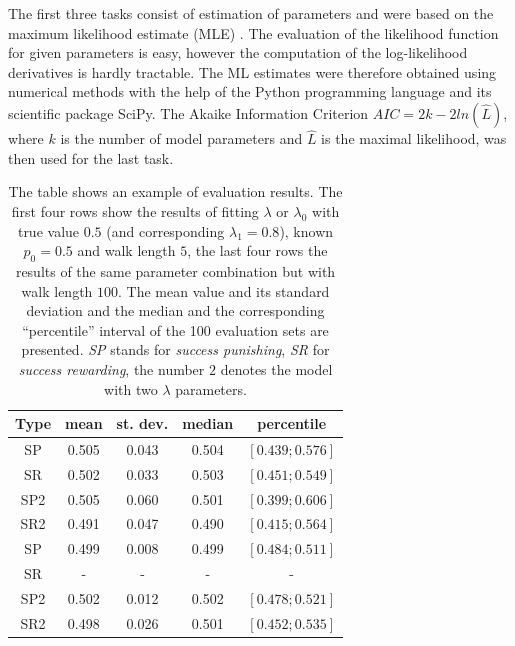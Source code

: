 \documentclass{amsart}
\theoremstyle{definition}
\theoremstyle{plain}
\theoremstyle{plain}
\theoremstyle{plain}
\numberwithin{equation}{section}
\begin{document}
    The first three tasks consist of estimation of parameters and were based on the maximum likelihood estimate (MLE) \cite{rossi2018mathematical}. The evaluation of the likelihood function for given parameters is easy, however the computation of the log-likelihood derivatives is hardly tractable. The ML estimates were therefore obtained using numerical methods with the help of the Python programming language and its scientific package SciPy. The Akaike Information Criterion $AIC=2k-2ln(\hat{L})$, where $k$ is the number of model parameters and $\hat{L}$ is the maximal likelihood, was then used for the last task.

    \begin{table}
        \color{red}
        \begin{centering}
        {\caption{\label{tab:Fitting-results} The table shows an example of evaluation results.
        The first four rows show the results of fitting $\lambda$ or $\lambda_{0}$ with true value $0.5$ (and corresponding $\lambda_{1}=0.8$), known $p_0=0.5$ and walk length $5$, the last four rows the results of the same parameter combination but with walk length $100$.
        The mean value and its standard deviation and the median and the corresponding ``percentile'' interval of the 100 evaluation sets are presented.
            \emph{SP} stands for \emph{success punishing}, \emph{SR} for \emph{success rewarding}, the number $2$ denotes the model with two $\lambda$ parameters.}}
            \begin{tabular}{|c|c|c|c|c|}
                \hline
                Type & mean & st. dev. & median & percentile \tabularnewline
                \hline
                SP & 0.505 & 0.043 & 0.504 & $[0.439;0.576]$ \tabularnewline
                \hline
                SR & 0.502 & 0.033 & 0.503 & $[0.451;0.549]$ \tabularnewline
                \hline
                SP2 & 0.505 & 0.060 & 0.501 & $[0.399;0.606]$ \tabularnewline
                \hline
                SR2 & 0.491 & 0.047 & 0.490 & $[0.415;0.564]$ \tabularnewline
                \hline
                \hline
                SP & 0.499 & 0.008 & 0.499 & $[0.484;0.511]$ \tabularnewline
                \hline
                SR & - & - & - & - \tabularnewline
                \hline
                SP2 & 0.502 & 0.012 & 0.502 & $[0.478;0.521]$ \tabularnewline
                \hline
                SR2 & 0.498 & 0.026 & 0.501 & $[0.452;0.535]$ \tabularnewline
                \hline
            \end{tabular}
            \par
        \end{centering}
    \end{table}
\end{document}
